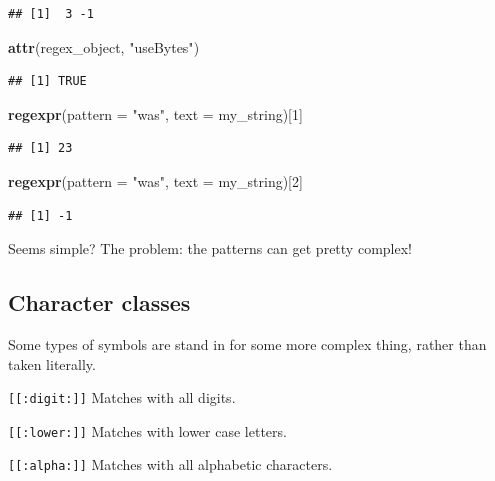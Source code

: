 \documentclass[]{book}
\newenvironment{Shaded}{\begin{snugshade}}{\end{snugshade}}
\newcommand{\KeywordTok}[1]{\textcolor[rgb]{0.13,0.29,0.53}{\textbf{#1}}}
\newcommand{\DataTypeTok}[1]{\textcolor[rgb]{0.13,0.29,0.53}{#1}}
\newcommand{\DecValTok}[1]{\textcolor[rgb]{0.00,0.00,0.81}{#1}}
\newcommand{\StringTok}[1]{\textcolor[rgb]{0.31,0.60,0.02}{#1}}
\newcommand{\NormalTok}[1]{#1}
\theoremstyle{definition}
\theoremstyle{definition}
\theoremstyle{definition}
\theoremstyle{remark}
\begin{document}
\begin{verbatim}
## [1]  3 -1
\end{verbatim}

\begin{Shaded}
\begin{Highlighting}[]
\KeywordTok{attr}\NormalTok{(regex_object, }\StringTok{"useBytes"}\NormalTok{)}
\end{Highlighting}
\end{Shaded}

\begin{verbatim}
## [1] TRUE
\end{verbatim}

\begin{Shaded}
\begin{Highlighting}[]
\KeywordTok{regexpr}\NormalTok{(}\DataTypeTok{pattern =} \StringTok{"was"}\NormalTok{, }\DataTypeTok{text =}\NormalTok{ my_string)[}\DecValTok{1}\NormalTok{]}
\end{Highlighting}
\end{Shaded}

\begin{verbatim}
## [1] 23
\end{verbatim}

\begin{Shaded}
\begin{Highlighting}[]
\KeywordTok{regexpr}\NormalTok{(}\DataTypeTok{pattern =} \StringTok{"was"}\NormalTok{, }\DataTypeTok{text =}\NormalTok{ my_string)[}\DecValTok{2}\NormalTok{]}
\end{Highlighting}
\end{Shaded}

\begin{verbatim}
## [1] -1
\end{verbatim}

Seems simple? The problem: the patterns can get pretty complex!

\subsection{Character classes}\label{character-classes}

Some types of symbols are stand in for some more complex thing, rather
than taken literally.

\texttt{{[}{[}:digit:{]}{]}} Matches with all digits.

\texttt{{[}{[}:lower:{]}{]}} Matches with lower case letters.

\texttt{{[}{[}:alpha:{]}{]}} Matches with all alphabetic characters.
\end{document}

